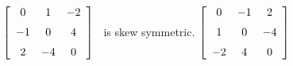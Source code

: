 {$\left[ \begin {array}{ccc} 0&1&-2\\\noalign{\medskip}-1&0&4
\\\noalign{\medskip}2&-4&0\end {array} \right]$} 
{\tta\ is skew symmetric. $\left[ \begin {array}{ccc} 0&-1&2\\\noalign{\medskip}1&0&-4\\\noalign{\medskip}-2&4&0\end {array} \right]
$}


  

